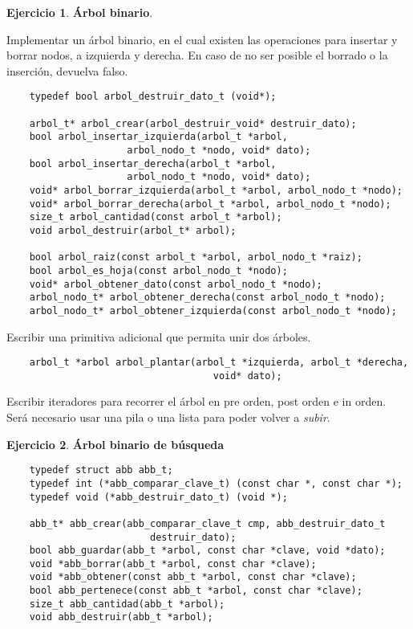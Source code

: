 \documentclass[11pt,a4paper]{article}
\theoremstyle{definition}
\newtheorem{ejercicio}{Ejercicio}[section]
\begin{document}
\begin{ejercicio}
\textbf{Árbol binario}.
\begin{partes}
\item Implementar un árbol binario, en el cual existen las operaciones para
insertar y borrar nodos, a izquierda y derecha.  En caso de no ser posible
el borrado o la inserción, devuelva falso.
\begin{lstlisting}
    typedef bool arbol_destruir_dato_t (void*);

    arbol_t* arbol_crear(arbol_destruir_void* destruir_dato);
    bool arbol_insertar_izquierda(arbol_t *arbol,
                     arbol_nodo_t *nodo, void* dato);
    bool arbol_insertar_derecha(arbol_t *arbol,
                     arbol_nodo_t *nodo, void* dato);
    void* arbol_borrar_izquierda(arbol_t *arbol, arbol_nodo_t *nodo);
    void* arbol_borrar_derecha(arbol_t *arbol, arbol_nodo_t *nodo);
    size_t arbol_cantidad(const arbol_t *arbol);
    void arbol_destruir(arbol_t* arbol);

    bool arbol_raiz(const arbol_t *arbol, arbol_nodo_t *raiz);
    bool arbol_es_hoja(const arbol_nodo_t *nodo);
    void* arbol_obtener_dato(const arbol_nodo_t *nodo);
    arbol_nodo_t* arbol_obtener_derecha(const arbol_nodo_t *nodo);
    arbol_nodo_t* arbol_obtener_izquierda(const arbol_nodo_t *nodo);
\end{lstlisting}
\item Escribir una primitiva adicional que permita unir dos árboles.
\begin{lstlisting}
    arbol_t *arbol arbol_plantar(arbol_t *izquierda, arbol_t *derecha,
                                    void* dato);
\end{lstlisting}

\item Escribir iteradores para recorrer el árbol en pre orden, post orden e
in orden. Será necesario usar una pila o una lista para poder volver a
\textit{subir}.
\end{partes}
\end{ejercicio}

\begin{ejercicio}
\textbf{Árbol binario de búsqueda}
\begin{lstlisting}
    typedef struct abb abb_t;
    typedef int (*abb_comparar_clave_t) (const char *, const char *);
    typedef void (*abb_destruir_dato_t) (void *);

    abb_t* abb_crear(abb_comparar_clave_t cmp, abb_destruir_dato_t
                         destruir_dato);
    bool abb_guardar(abb_t *arbol, const char *clave, void *dato);
    void *abb_borrar(abb_t *arbol, const char *clave);
    void *abb_obtener(const abb_t *arbol, const char *clave);
    bool abb_pertenece(const abb_t *arbol, const char *clave);
    size_t abb_cantidad(abb_t *arbol);
    void abb_destruir(abb_t *arbol);
\end{lstlisting}
\end{ejercicio}
\end{document}
